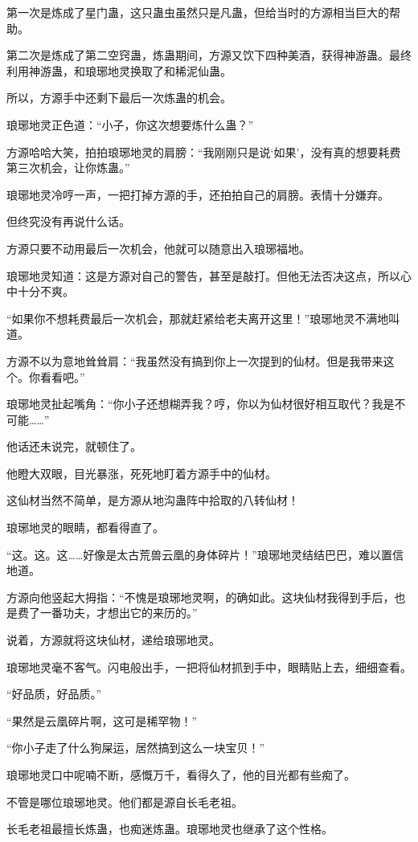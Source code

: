 \begin{this_body}
第一次是炼成了星门蛊，这只蛊虫虽然只是凡蛊，但给当时的方源相当巨大的帮助。

第二次是炼成了第二空窍蛊，炼蛊期间，方源又饮下四种美酒，获得神游蛊。最终利用神游蛊，和琅琊地灵换取了和稀泥仙蛊。

所以，方源手中还剩下最后一次炼蛊的机会。

琅琊地灵正色道：“小子，你这次想要炼什么蛊？”

方源哈哈大笑，拍拍琅琊地灵的肩膀：“我刚刚只是说‘如果’，没有真的想要耗费第三次机会，让你炼蛊。”

琅琊地灵冷哼一声，一把打掉方源的手，还拍拍自己的肩膀。表情十分嫌弃。

但终究没有再说什么话。

方源只要不动用最后一次机会，他就可以随意出入琅琊福地。

琅琊地灵知道：这是方源对自己的警告，甚至是敲打。但他无法否决这点，所以心中十分不爽。

“如果你不想耗费最后一次机会，那就赶紧给老夫离开这里！”琅琊地灵不满地叫道。

方源不以为意地耸耸肩：“我虽然没有搞到你上一次提到的仙材。但是我带来这个。你看看吧。”

琅琊地灵扯起嘴角：“你小子还想糊弄我？哼，你以为仙材很好相互取代？我是不可能……”

他话还未说完，就顿住了。

他瞪大双眼，目光暴涨，死死地盯着方源手中的仙材。

这仙材当然不简单，是方源从地沟蛊阵中拾取的八转仙材！

琅琊地灵的眼睛，都看得直了。

“这。这。这……好像是太古荒兽云凰的身体碎片！”琅琊地灵结结巴巴，难以置信地道。

方源向他竖起大拇指：“不愧是琅琊地灵啊，的确如此。这块仙材我得到手后，也是费了一番功夫，才想出它的来历的。”

说着，方源就将这块仙材，递给琅琊地灵。

琅琊地灵毫不客气。闪电般出手，一把将仙材抓到手中，眼睛贴上去，细细查看。

“好品质，好品质。”

“果然是云凰碎片啊，这可是稀罕物！”

“你小子走了什么狗屎运，居然搞到这么一块宝贝！”

琅琊地灵口中呢喃不断，感慨万千，看得久了，他的目光都有些痴了。

不管是哪位琅琊地灵。他们都是源自长毛老祖。

长毛老祖最擅长炼蛊，也痴迷炼蛊。琅琊地灵也继承了这个性格。


\end{this_body}
